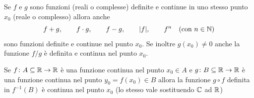   \begin{theorem}
  \label{th:continuita_composizione}%
  Se $f$ e $g$ sono funzioni (reali o complesse) definite e continue
  in uno stesso punto $x_0$ (reale o complesso)
  allora anche
  \[
    f+g, \qquad
    f\cdot g, \qquad
    f-g, \qquad
    {\left|f\right|}, \qquad
    f^n\quad \text{(con $n\in {\mathbb N}$)}
  \]
  sono funzioni definite e continue nel punto $x_0$.
  Se inoltre $g(x_0)\neq 0$ anche la funzione
  $f/g$
  è definita e continua nel punto $x_0$.
  
  Se $f\colon A\subseteq {\mathbb R} \to {\mathbb R}$ è una funzione continua
  nel punto $x_0\in A$ e
  $g\colon B\subseteq {\mathbb R} \to {\mathbb R}$ è una funzione
  continua nel punto $y_0=f(x_0)\in B$ allora la funzione $g\circ f$
  definita in $f^{-1}(B)$ è continua nel punto $x_0$
  (lo stesso vale sostituendo ${\mathbb C}$ ad ${\mathbb R}$)
  \end{theorem}
